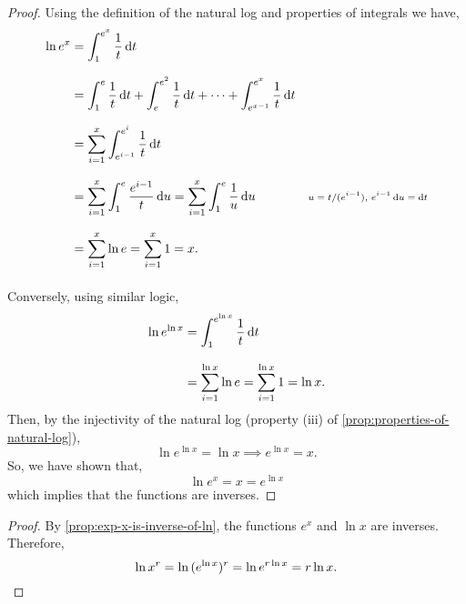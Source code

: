 \documentclass[MathsNotesBase.tex]{subfiles}
\begin{document}
{	\bigskip\bigskip
	\begin{proof}
		Using the definition of the natural log and properties of integrals we have,
		\begin{align*}
		\ln{e^x} &= \int_1^{e^x} \frac{1}{t} \dif t \\[8pt]
		  		 &= \int_1^{e} \frac{1}{t} \dif t + \int_e^{e^2} \frac{1}{t} \dif t + \cdots + \int_{e^{x-1}}^{e^x} \frac{1}{t} \dif t &\sidecomment{} \\[8pt]
		  		 &= \sum_{i=1}^x \int_{e^{i-1}}^{e^i} \frac{1}{t} \dif t \\[8pt]
		  		 &= \sum_{i=1}^x \int_{1}^e \frac{e^{i-1}}{t} \dif u = \sum_{i=1}^x \int_{1}^e \frac{1}{u} \dif u &\sidecomment{${ u = t/(e^{i-1}),\, e^{i-1}\dif u = \dif t }$}\\[8pt]
		  		 &= \sum_{i=1}^x \ln{e} = \sum_{i=1}^x 1 = x. \\[8pt]
		\end{align*}
		Conversely, using similar logic,
		\begin{align*}
		&& \ln{e^{\ln{x}}} &= \int_1^{e^{\ln{x}}} \frac{1}{t} \dif t \\[8pt]
		&&  &= \sum_{i=1}^{\ln{x}} \ln{e} = \sum_{i=1}^{\ln{x}} 1 = \ln{x}. &\sidecomment{} \\
		\end{align*}
		Then, by the injectivity of the natural log (property (iii) of \autoref{prop:properties-of-natural-log}),
		\[ \ln{e^{\ln{x}}} = \ln{x} \implies e^{\ln{x}} = x. \]
		So, we have shown that,
		\[ \ln{e^x} = x = e^{\ln{x}} \]
		which implies that the functions are inverses.
	\end{proof}

	
	\bigskip\bigskip
	\begin{proof}
		By \autoref{prop:exp-x-is-inverse-of-ln}, the functions ${ e^x }$ and ${ \ln{x} }$ are inverses. Therefore,
		\[ \ln{x^r} = \ln{(e^{\ln{x}})^r} = \ln{e^{r\ln{x}}} = r\ln{x}. \qedhere \]
	\end{proof}
	

}
\end{document}
